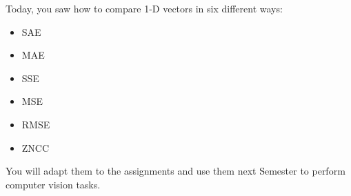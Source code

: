 \documentclass[english,a4paper,12pt,oneside]{article}
\begin{document}
Today, you saw how to compare 1-D vectors in six different ways:
\begin{itemize}
\item SAE
\item MAE
\item SSE
\item MSE
\item RMSE
\item ZNCC
\end{itemize}
You will adapt them to the assignments and use them next Semester to perform computer vision tasks.



%
%
%
%
%
%
%
%
%
%
\end{document}

